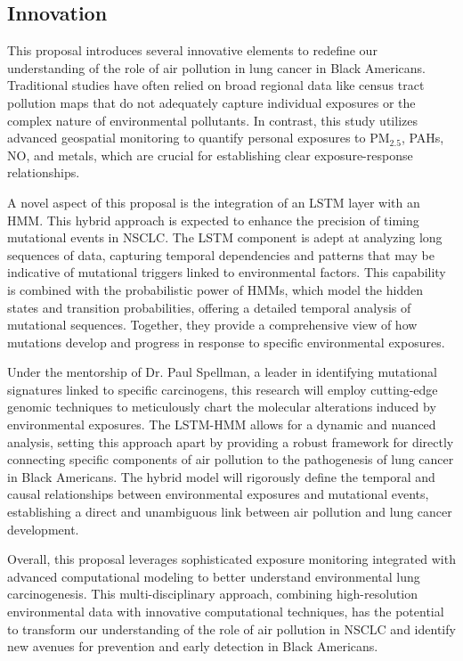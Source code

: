 \subsection{Innovation}

This proposal introduces several innovative elements to redefine our understanding of the 
role of air pollution in lung cancer in Black Americans. 
Traditional studies have often relied on broad regional data like census tract pollution maps 
that do not adequately capture individual exposures or the complex nature of environmental pollutants. 
In contrast, this study utilizes advanced geospatial monitoring to quantify personal exposures to 
PM$_{2.5}$, PAHs, NO, and metals, which are crucial for establishing clear exposure-response relationships.

A novel aspect of this proposal is the integration of an LSTM layer with an HMM.
This hybrid approach is expected to enhance the precision of timing mutational events in NSCLC. 
The LSTM component is adept at analyzing long sequences of data, 
capturing temporal dependencies and patterns that may be indicative of mutational triggers linked to environmental factors. 
This capability is combined with the probabilistic power of HMMs, 
which model the hidden states and transition probabilities, offering a detailed temporal analysis of mutational sequences. 
Together, they provide a comprehensive view of how mutations develop and progress in response to specific environmental exposures.

Under the mentorship of Dr. Paul Spellman, a leader in identifying mutational signatures linked to specific carcinogens, 
this research will employ cutting-edge genomic techniques to meticulously chart the molecular alterations induced by environmental exposures. 
The LSTM-HMM allows for a dynamic and nuanced analysis, 
setting this approach apart by providing a robust framework for directly connecting 
specific components of air pollution to the pathogenesis of lung cancer in Black Americans. 
The hybrid model will rigorously define the temporal and causal relationships between environmental 
exposures and mutational events, establishing a direct and unambiguous link between air pollution and lung cancer development.

Overall, this proposal leverages sophisticated exposure monitoring 
integrated with advanced computational modeling to better understand environmental lung carcinogenesis. 
This multi-disciplinary approach, combining high-resolution environmental data with innovative computational techniques, 
has the potential to transform our understanding of the role of air pollution in NSCLC 
and identify new avenues for prevention and early detection in Black Americans.


